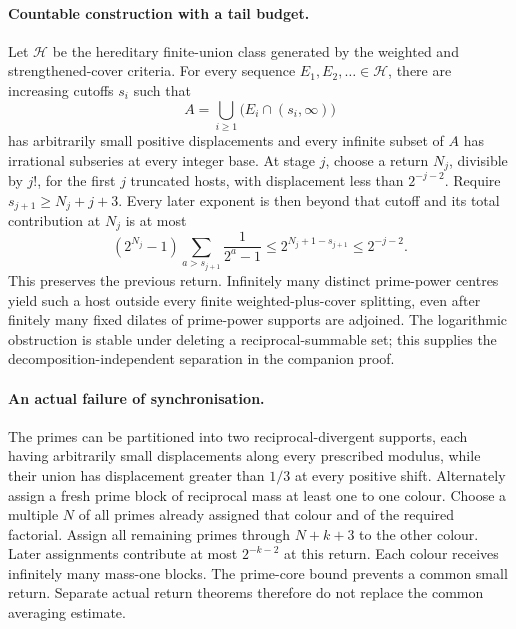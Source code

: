 
\paragraph{Countable construction with a tail budget.}
Let $\mathcal H$ be the hereditary finite-union class generated by the
weighted and strengthened-cover criteria. For every sequence
$E_1,E_2,\ldots\in\mathcal H$, there are increasing cutoffs $s_i$ such that
\[
 A=\bigcup_{i\ge1}\bigl(E_i\cap(s_i,\infty)\bigr)
\]
has arbitrarily small positive displacements and every infinite subset
of $A$ has irrational subseries at every integer base.
At stage $j$, choose a return $N_j$, divisible by $j!$, for the first
$j$ truncated hosts, with displacement less than $2^{-j-2}$.
Require $s_{j+1}\ge N_j+j+3$. Every later exponent is then beyond that
cutoff and its total contribution at $N_j$ is at most
\[
 (2^{N_j}-1)\sum_{a>s_{j+1}}\frac1{2^a-1}
 \le2^{N_j+1-s_{j+1}}\le2^{-j-2}.
\]
This preserves the previous return. Infinitely many distinct prime-power
centres yield such a host outside every finite weighted-plus-cover
splitting, even after finitely many fixed dilates of prime-power supports
are adjoined. The logarithmic obstruction is stable under deleting a
reciprocal-summable set; this supplies the decomposition-independent
separation in the companion proof.

\paragraph{An actual failure of synchronisation.}
The primes can be partitioned into two reciprocal-divergent supports,
each having arbitrarily small displacements along every prescribed
modulus, while their union has displacement greater than $1/3$ at every
positive shift. Alternately assign a fresh prime block of reciprocal
mass at least one to one colour. Choose a multiple $N$ of all primes
already assigned that colour and of the required factorial. Assign all
remaining primes through $N+k+3$ to the other colour. Later assignments
contribute at most $2^{-k-2}$ at this return. Each colour receives
infinitely many mass-one blocks. The prime-core bound prevents a common
small return. Separate actual return theorems therefore do not replace
the common averaging estimate.
